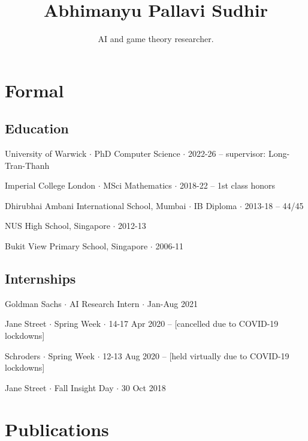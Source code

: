 \documentclass{article}
\title{\Large\bf Abhimanyu Pallavi Sudhir}
\subtitle{AI and game theory researcher. \\ %
\vspace{-2em}}
\newcommand{\archive}{\color{lightgray}}
\begin{document}
\begingroup
\let\center\flushleft
\let\endcenter\endflushleft
\maketitle
\endgroup

\section*{Formal}

\subsection*{Education}
\begin{itemize}
    \item University of Warwick $\cdot$ PhD Computer Science $\cdot$ 2022-26 -- supervisor: Long-Tran-Thanh %
    \item Imperial College London $\cdot$ MSci Mathematics $\cdot$ 2018-22 -- 1st class honors
{\archive
    \item Dhirubhai Ambani International School, Mumbai $\cdot$ IB Diploma $\cdot$ 2013-18 -- 44/45
    \item NUS High School, Singapore $\cdot$ 2012-13
    \item Bukit View Primary School, Singapore $\cdot$ 2006-11
}
\end{itemize}

\subsection*{Internships}
\begin{itemize}
    \item Goldman Sachs $\cdot$ AI Research Intern $\cdot$ Jan-Aug 2021%
{\archive
    \item Jane Street $\cdot$ Spring Week $\cdot$ 14-17 Apr 2020 -- [cancelled due to COVID-19 lockdowns]
    \item Schroders $\cdot$ Spring Week $\cdot$ 12-13 Aug 2020 -- [held virtually due to COVID-19 lockdowns]
    \item Jane Street $\cdot$ Fall Insight Day $\cdot$ 30 Oct 2018
}
\end{itemize}

\section*{Publications}
\end{document}
